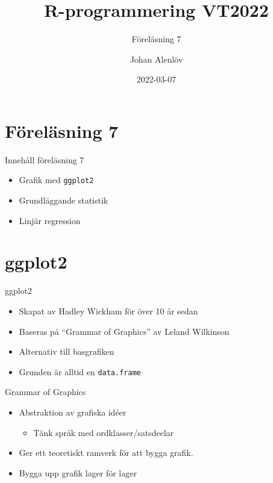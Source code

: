 \documentclass[
  11pt,
  ignorenonframetext,
  handout]{beamer}
\title{R-programmering VT2022}
\subtitle{Föreläsning 7}
\author{Johan Alenlöv}
\date{2022-03-07}
\institute{Linköpings Universitet}
\providecommand{\tightlist}{%
  \setlength{\itemsep}{0pt}\setlength{\parskip}{0pt}}
\begin{document}
\frame{\titlepage}

\hypertarget{fuxf6reluxe4sning-7}{%
\section{Föreläsning 7}\label{fuxf6reluxe4sning-7}}

\begin{frame}{Innehåll föreläsning 7}
\protect\hypertarget{innehuxe5ll-fuxf6reluxe4sning-7}{}
\begin{itemize}
\tightlist
\item
  Grafik med \texttt{ggplot2}
\item
  Grundläggande statistik
\item
  Linjär regression
\end{itemize}
\end{frame}

\hypertarget{ggplot2}{%
\section{ggplot2}\label{ggplot2}}

\begin{frame}{ggplot2}
\protect\hypertarget{ggplot2-1}{}
\begin{itemize}
\tightlist
\item
  Skapat av Hadley Wickham för över 10 år sedan
\item
  Baseras på ``Grammar of Graphics'' av Leland Wilkinson
\item
  Alternativ till basgrafiken
\item
  Grunden är alltid en \texttt{data.frame}
\end{itemize}
\end{frame}

\begin{frame}{Grammar of Graphics}
\protect\hypertarget{grammar-of-graphics}{}
\begin{itemize}
\tightlist
\item
  Abstraktion av grafiska idéer

  \begin{itemize}
  \tightlist
  \item
    Tänk språk med ordklasser/satsdeelar
  \end{itemize}
\item
  Ger ett teoretiskt ramverk för att bygga grafik.
\item
  Bygga upp grafik lager för lager
\end{itemize}
\end{frame}
\end{document}
